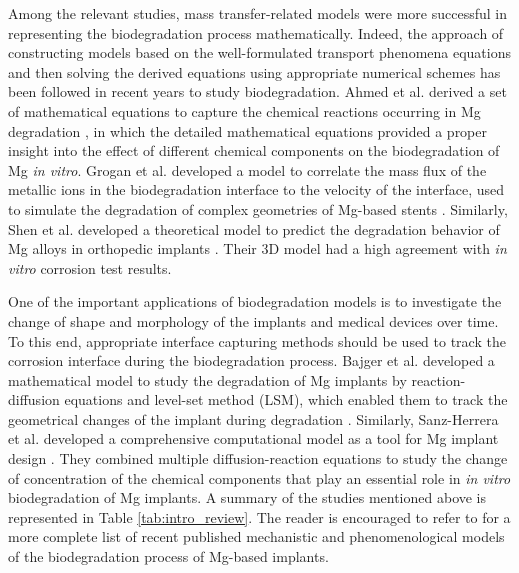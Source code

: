 Among the relevant studies, mass transfer-related models were more successful in representing the biodegradation process mathematically. Indeed, the approach of constructing models based on the well-formulated transport phenomena equations and then solving the derived equations using appropriate numerical schemes has been followed in recent years to study biodegradation. Ahmed et al. derived a set of mathematical equations to capture the chemical reactions occurring in Mg degradation \cite{Ahmed2017}, in which the detailed mathematical equations provided a proper insight into the effect of different chemical components on the biodegradation of Mg \textit{in vitro}. Grogan et al. developed a model to correlate the mass flux of the metallic ions in the biodegradation interface to the velocity of the interface, used to simulate the degradation of complex geometries of Mg-based stents \cite{Grogan2014}. Similarly, Shen et al. developed a theoretical model to predict the degradation behavior of Mg alloys in orthopedic implants \cite{Shen2019}. Their 3D model had a high agreement with \textit{in vitro} corrosion test results.


One of the important applications of biodegradation models is to investigate the change of shape and morphology of the implants and medical devices over time. To this end, appropriate interface capturing methods should be used to track the corrosion interface during the biodegradation process. Bajger et al. developed a mathematical model to study the degradation of Mg implants by reaction-diffusion equations and level-set method (\gls{LSM}), which enabled them to track the geometrical changes of the implant during degradation \cite{Bajger2016}. Similarly, Sanz-Herrera et al. developed a comprehensive computational model as a tool for Mg implant design \cite{Sanz-Herrera2018}. They combined multiple diffusion-reaction equations to study the change of concentration of the chemical components that play an essential role in \textit{in vitro} biodegradation of Mg implants. A summary of the studies mentioned above is represented in Table \ref{tab:intro_review}. The reader is encouraged to refer to \cite{Albaraghtheh2022} for a more complete list of recent published mechanistic and phenomenological models of the biodegradation process of Mg-based implants.

\clearpage


